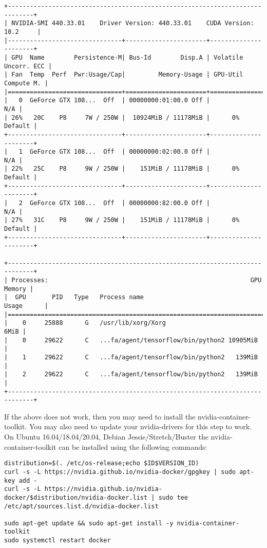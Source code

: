 \documentclass[
]{book}
\begin{document}
\begin{verbatim}
+-----------------------------------------------------------------------------+
| NVIDIA-SMI 440.33.01    Driver Version: 440.33.01    CUDA Version: 10.2     |
|-------------------------------+----------------------+----------------------+
| GPU  Name        Persistence-M| Bus-Id        Disp.A | Volatile Uncorr. ECC |
| Fan  Temp  Perf  Pwr:Usage/Cap|         Memory-Usage | GPU-Util  Compute M. |
|===============================+======================+======================|
|   0  GeForce GTX 108...  Off  | 00000000:01:00.0 Off |                  N/A |
| 26%   20C    P8     7W / 250W |  10924MiB / 11178MiB |      0%      Default |
+-------------------------------+----------------------+----------------------+
|   1  GeForce GTX 108...  Off  | 00000000:02:00.0 Off |                  N/A |
| 22%   25C    P8     9W / 250W |    151MiB / 11178MiB |      0%      Default |
+-------------------------------+----------------------+----------------------+
|   2  GeForce GTX 108...  Off  | 00000000:82:00.0 Off |                  N/A |
| 27%   31C    P8     9W / 250W |    151MiB / 11178MiB |      0%      Default |
+-------------------------------+----------------------+----------------------+
                                                                               
+-----------------------------------------------------------------------------+
| Processes:                                                       GPU Memory |
|  GPU       PID   Type   Process name                             Usage      |
|=============================================================================|
|    0     25888      G   /usr/lib/xorg/Xorg                             6MiB |
|    0     29622      C   ...fa/agent/tensorflow/bin/python2 10905MiB |
|    1     29622      C   ...fa/agent/tensorflow/bin/python2   139MiB |
|    2     29622      C   ...fa/agent/tensorflow/bin/python2   139MiB |
+-----------------------------------------------------------------------------+
\end{verbatim}

If the above does not work, then you may need to install the nvidia-container-toolkit. You may also need to update your nvidia-drivers for this step to work. On Ubuntu 16.04/18.04/20.04, Debian Jessie/Stretch/Buster the nvidia-container-toolkit can be installed using the following commands:

\begin{verbatim}
distribution=$(. /etc/os-release;echo $ID$VERSION_ID)
curl -s -L https://nvidia.github.io/nvidia-docker/gpgkey | sudo apt-key add -
curl -s -L https://nvidia.github.io/nvidia-docker/$distribution/nvidia-docker.list | sudo tee /etc/apt/sources.list.d/nvidia-docker.list

sudo apt-get update && sudo apt-get install -y nvidia-container-toolkit
sudo systemctl restart docker
\end{verbatim}
\end{document}
